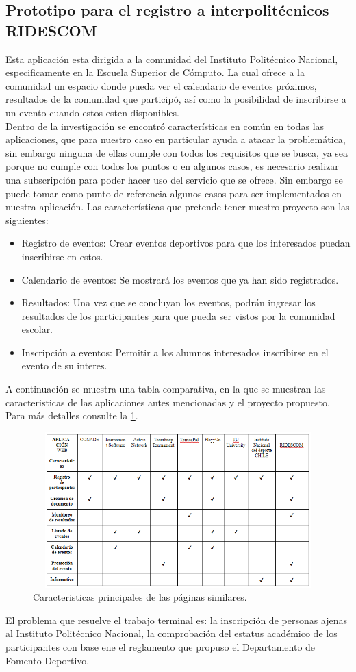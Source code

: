 \subsection{Prototipo para el registro a interpolitécnicos RIDESCOM}
\noindent Esta aplicación esta dirigida a la comunidad del Instituto Politécnico Nacional, especificamente en la Escuela Superior de Cómputo. La cual ofrece a la comunidad un espacio donde pueda ver el calendario de eventos próximos, resultados de la comunidad que participó, así como la posibilidad de inscribirse a un evento cuando estos esten disponibles. 
\\Dentro de la investigación se encontró características en común en todas las aplicaciones, que para nuestro caso en particular ayuda a atacar la problemática, sin embargo ninguna de ellas cumple con todos los requisitos que se busca, ya sea porque no cumple con todos los puntos o en algunos casos, es necesario realizar una subscripción para poder hacer uso del servicio que se ofrece. Sin embargo se puede tomar como punto de referencia algunos casos para ser implementados en nuestra aplicación.
Las características que pretende tener nuestro proyecto son las siguientes:
\begin{itemize}
	\item Registro de eventos: Crear eventos deportivos para que los interesados puedan inscribirse en estos.
	\item Calendario de eventos: Se mostrará los eventos que ya han sido registrados.
	\item Resultados: Una vez que se concluyan los eventos, podrán ingresar los resultados de los participantes para que pueda ser vistos por la comunidad escolar.
	\item Inscripción a eventos: Permitir a los alumnos interesados inscribirse en el evento de su interes. 
\end{itemize}

\noindent A continuación se muestra una tabla comparativa, en la que se muestran las caracteristicas de las aplicaciones antes mencionadas y el proyecto propuesto. Para más detalles consulte la \ref{tablacomparativa}.

\begin{figure} [hbt!]
	\centering
	\includegraphics[width=15cm, height=6cm]{Imagenes/tablaComparativa}
	\caption{Caracteristicas principales de las páginas similares.}
	\label{tablacomparativa}
\end{figure}

\noindent El problema que resuelve el trabajo terminal es: la inscripción de personas ajenas al Instituto Politécnico Nacional, la comprobación del estatus académico de los participantes con base ene el reglamento que propuso el Departamento de Fomento Deportivo.